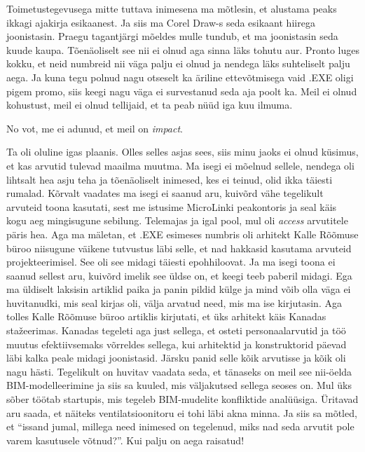 Toimetustegevusega mitte tuttava inimesena ma mõtlesin, et  alustama peaks ikkagi ajakirja esikaanest. Ja siis ma Corel Draw-s seda esikaant  hiirega joonistasin. Praegu tagantjärgi mõeldes mulle tundub, et ma joonistasin seda kuude kaupa. Tõenäoliselt see nii ei olnud aga sinna läks tohutu aur. Pronto luges kokku, et neid numbreid nii väga palju ei olnud ja nendega läks suhteliselt palju aega. Ja kuna tegu polnud nagu otseselt ka äriline ettevõtmisega vaid .EXE oligi pigem promo, siis keegi nagu väga ei survestanud seda aja poolt ka. Meil ei olnud kohustust, meil ei olnud tellijaid, et ta peab nüüd iga kuu ilmuma.


No vot, me ei adunud, et meil on \emph{impact}.


Ta oli oluline igas plaanis. Olles selles asjas sees, siis minu jaoks ei olnud  küsimus, et kas arvutid tulevad maailma muutma. Ma isegi ei mõelnud sellele, nendega oli lihtsalt hea asju teha ja  tõenäoliselt inimesed, kes ei teinud, olid ikka täiesti rumalad. Kõrvalt vaadates ma isegi ei saanud aru, kuivõrd vähe tegelikult arvuteid toona kasutati, sest me istusime MicroLinki peakontoris ja seal käis kogu aeg mingisugune sebilung. Telemajas ja igal pool, mul oli \emph{access} arvutitele päris hea. Aga ma mäletan, et .EXE  esimeses numbris  oli arhitekt Kalle Rõõmuse büroo niisugune väikene tutvustus  läbi selle, et nad hakkasid kasutama arvuteid projekteerimisel. See oli see midagi täiesti epohhiloovat. Ja ma isegi toona ei saanud sellest aru, kuivõrd imelik see  üldse on, et keegi teeb  paberil midagi. Ega  ma üldiselt  laksisin artiklid paika ja panin pildid külge ja mind võib olla väga ei huvitanudki, mis seal kirjas oli, välja arvatud need, mis ma ise kirjutasin. Aga tolles Kalle Rõõmuse büroo artiklis kirjutati, et üks arhitekt käis Kanadas stažeerimas. Kanadas tegeleti aga just sellega, et osteti personaalarvutid ja töö muutus efektiivsemaks võrreldes sellega, kui arhitektid ja konstruktorid päevad läbi kalka peale midagi joonistasid.  Järsku panid selle kõik arvutisse ja kõik oli nagu hästi. Tegelikult on huvitav vaadata seda, et tänaseks on meil see nii-öelda BIM-modelleerimine ja siis sa kuuled, mis väljakutsed sellega seoses on. Mul üks sõber töötab startupis, mis tegeleb BIM-mudelite konfliktide analüüsiga. Üritavad aru saada, et näiteks ventilatsioonitoru ei tohi läbi akna minna. Ja siis sa mõtled, et \enquote{issand jumal, millega need inimesed on tegelenud, miks nad seda arvutit pole varem kasutusele võtnud?}. Kui palju on aega raisatud!

